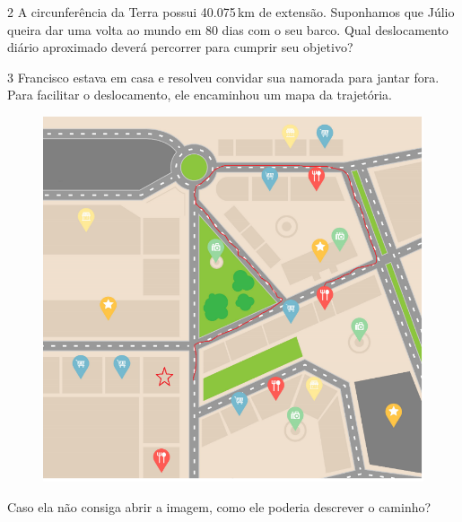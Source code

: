 {{{


\num{2} A circunferência da Terra possui 40.075\,km de extensão. Suponhamos
que Júlio queira dar uma volta ao mundo em 80 dias com o seu barco. Qual
deslocamento diário aproximado deverá percorrer para cumprir seu
objetivo?


\num{3} Francisco estava em casa e resolveu convidar sua namorada para jantar
fora. Para facilitar o deslocamento, ele encaminhou um mapa da
trajetória.



\begin{figure}[H]
\centering\includegraphics[width=\textwidth]{./imgSAEB_8_MAT/media/image37.png}
\end{figure}


Caso ela não consiga abrir a imagem, como ele poderia descrever o
caminho?

}}}
